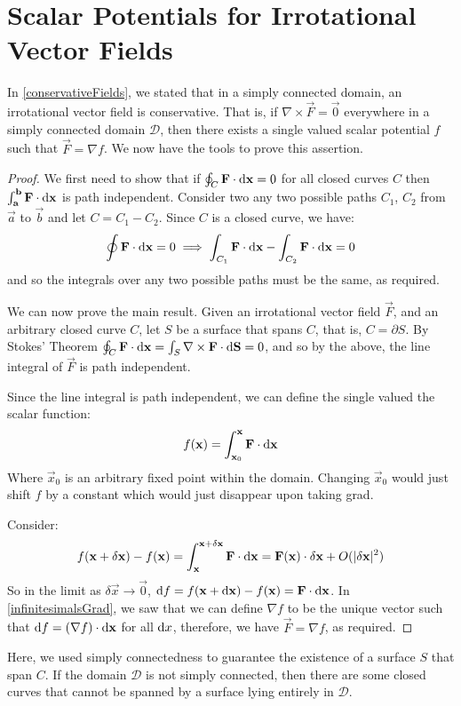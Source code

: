 \documentclass[../main.tex]{subfiles}
\begin{document}
\section{Scalar Potentials for Irrotational Vector Fields}
\label{scalarPotentials}
In \cref{conservativeFields}, we stated that in a simply connected domain, an irrotational vector field is conservative.
That is, if $\nabla \times \vec{F} = \vec{0}$ everywhere in a simply connected domain $\mathscr{D}$, then there exists a single valued scalar potential $f$ such that $\vec{F} = \nabla f$.
We now have the tools to prove this assertion.
\begin{proof}
  We first need to show that if $\oint_C \vec{F} \cdot \d{\vec{x}} = 0$ for all closed curves $C$ then $\int_{\vec{a}}^{\vec{b}} \vec{F} \cdot  \d{\vec{x}}$ is path independent.
  Consider two any two possible paths $C_1$, $C_2$ from $\vec{a}$ to $\vec{b}$ and let $C = C_1 - C_2$.
  Since $C$ is a closed curve, we have:
  \[
    \oint \vec{F} \cdot \d{\vec{x}} = 0 \implies \int_{C_1} \vec{F} \cdot \d{\vec{x}} - \int_{C_2} \vec{F} \cdot  \d{\vec{x}} = 0
  \]
  and so the integrals over any two possible paths must be the same, as required.

  We can now prove the main result.
  Given an irrotational vector field $\vec{F}$, and an arbitrary closed curve $C$, let $S$ be a surface that spans $C$, that is, $C = \partial S$.
  By Stokes' Theorem $\oint_{C} \vec{F} \cdot \d{\vec{x}} = \int_{S} \nabla \times \vec{F} \cdot \d{\vec{S}} = 0$, and so by the above, the line integral of $\vec{F}$ is path independent.

  Since the line integral is path independent, we can define the single valued the scalar function:
  \[
    f(\vec{x}) = \int_{\vec{x}_0}^{\vec{x}} \vec{F} \cdot \d{\vec{x}}
  \]
  Where $\vec{x}_0$ is an arbitrary fixed point within the domain.
  Changing $\vec{x}_0$ would just shift $f$ by a constant which would just disappear upon taking grad.

  Consider:
  \[
    f(\vec{x} + \delta \vec{x}) - f(\vec{x}) = \int_{\vec{x}}^{\vec{x} + \delta \vec{x}}  \vec{F} \cdot \d{\vec{x}} = \vec{F}(\vec{x}) \cdot \delta \vec{x} + O(|\delta \vec{x}|^2)
  \]
  So in the limit as $\delta \vec{x} \to \vec{0}$, $\d{f} = f(\vec{x} + \d{\vec{x}}) - f(\vec{x}) = \vec{F} \cdot \d{\vec{x}}$.
  In \cref{infinitesimalsGrad}, we saw that we can define $\nabla f$ to be the unique vector such that $\d{f} = (\nabla f) \cdot \d{\vec{x}}$ for all $\d{x}$, therefore, we have $\vec{F} = \nabla f$, as required.
\end{proof}
\begin{remark}
  \nonexaminable
  Here, we used simply connectedness to guarantee the existence of a surface $S$ that span $C$.
  If the domain $\mathscr{D}$ is not simply connected, then there are some closed curves that cannot be spanned by a surface lying entirely in $\mathscr{D}$.
\end{remark}
\end{document}
